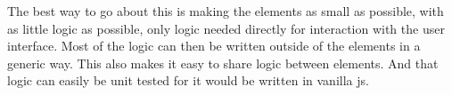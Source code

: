 The best way to go about this is making the elements as small as possible,
with as little logic as possible,
only logic needed directly for interaction with the user interface.
Most of the logic can then be written outside of the elements in a generic way.
This also makes it easy to share logic between elements.
And that logic can easily be unit tested
for it would be written in vanilla \gls{js}.
